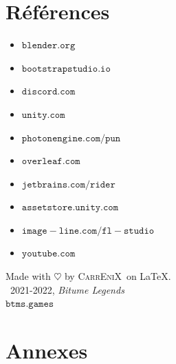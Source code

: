 \documentclass[12pt,a4paper]{article}
\newcommand{\btmlgs}{\textsl{Bitume Legends}}
\newcommand{\CEX}{\textsc{CarrEniX}}
\begin{document}
    \section*{Références}
        \begin{itemize}
            \item \(\mathtt{blender.org}\)
            \item \(\mathtt{bootstrapstudio.io}\)
            \item \(\mathtt{discord.com}\)
            \item \(\mathtt{unity.com}\)
            \item \(\mathtt{photonengine.com/pun}\)
            \item \(\mathtt{overleaf.com}\)
            \item \(\mathtt{jetbrains.com/rider}\)
            \item \(\mathtt{assetstore.unity.com}\)
            \item \(\mathtt{image-line.com/fl-studio}\)
            \item \(\mathtt{youtube.com}\)  %
        \end{itemize}

        \begin{center}
            Made with $\heartsuit$ by \CEX\, on \LaTeX.\\
            \textcopyright\, 2021-2022, \btmlgs\\
            \(\mathtt{btms.games}\)
        \end{center}

    \section*{Annexes}
    \listoffigures
\end{document}

